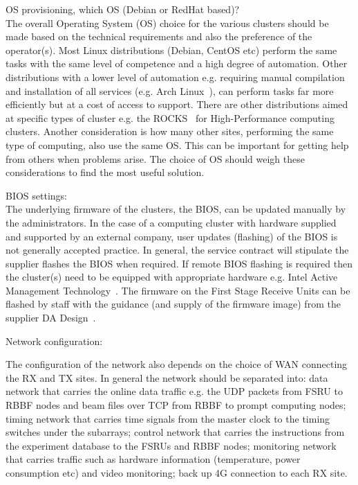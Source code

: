 \documentclass[12pt,a4paper]{article}
\begin{document}
\bitm
\item OS provisioning, which OS (Debian or RedHat based)? \\
The overall Operating System (OS) choice for the various clusters should be made based on the technical requirements and also the preference of the operator(s).
Most Linux distributions (Debian, CentOS etc) perform the same tasks with the same level of competence and a high degree of automation.
Other distributions with a lower level of automation e.g. requiring manual compilation and installation of all services (e.g. Arch Linux~\cite{archlinux}), can perform tasks far more efficiently but at a cost of access to support.  
There are other distributions aimed at specific types of cluster e.g. the ROCKS~\cite{rocks} for High-Performance computing clusters.
Another consideration is how many other sites, performing the same type of computing, also use the same OS.
This can be important for getting help from others when problems arise.
The choice of OS should weigh these considerations to find the most useful solution.
\item BIOS settings: \\%
The underlying firmware of the clusters, the BIOS, can be updated manually by the administrators.
In the case of a computing cluster with hardware supplied and supported by an external company, user updates (flashing) of the BIOS is not generally accepted practice.
In general, the service contract will stipulate the supplier flashes the BIOS when required.
If remote BIOS flashing is required then the cluster(s) need to be equipped with appropriate hardware e.g. Intel Active Management Technology~\cite{intel-amt}.
The firmware on the First Stage Receive Units can be flashed by \EC staff with the guidance (and supply of the firmware image) from the supplier DA Design~\cite{da-design}.
\item Network configuration:

The configuration of the network also depends on the choice of WAN connecting the RX and TX sites.
In general the network should be separated into: data network that carries the online data traffic e.g. the UDP packets from FSRU to RBBF nodes and beam files over TCP from RBBF to prompt computing nodes; timing network that carries time signals from the master clock to the timing switches under the subarrays; control network that carries the instructions from the experiment database to the FSRUs and RBBF nodes; monitoring network that carries traffic such as hardware information (temperature, power consumption etc) and video monitoring; back up 4G connection to each RX site.
\end{document}
